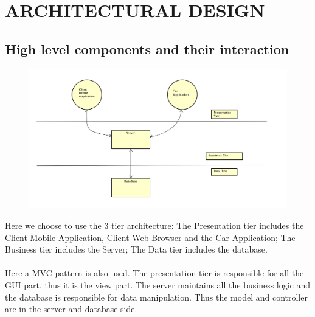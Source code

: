 \documentclass{article}
\begin{document}
	\section{ARCHITECTURAL DESIGN}
	
	\subsection{High level components and their interaction}
	\begin{figure}[h]
	\includegraphics[width=\textwidth]{High_Level}
	\end{figure}
	Here we choose to use the 3 tier architecture: The Presentation tier includes the Client Mobile Application, Client Web Browser and the Car Application; The Business tier includes the Server; The Data tier includes the database.
	\\
	\\Here a MVC pattern is also used. The presentation tier is responsible for all the GUI part, thus it is the view part. The server maintains all the business logic and the database is responsible for data manipulation. Thus the model and controller are in the server and database side. 
	\newpage
	
\end{document}
